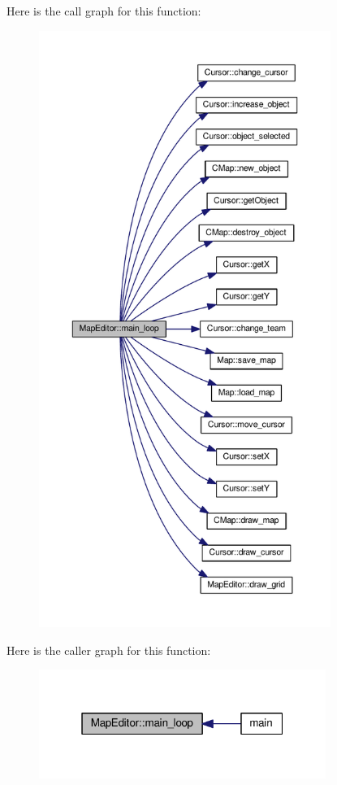 Here is the call graph for this function\+:\nopagebreak
\begin{figure}[H]
\begin{center}
\leavevmode
\includegraphics[height=550pt]{class_map_editor_a5937c9b49b1e342c219f8a87d8e3dd7a_cgraph}
\end{center}
\end{figure}




Here is the caller graph for this function\+:\nopagebreak
\begin{figure}[H]
\begin{center}
\leavevmode
\includegraphics[width=265pt]{class_map_editor_a5937c9b49b1e342c219f8a87d8e3dd7a_icgraph}
\end{center}
\end{figure}




